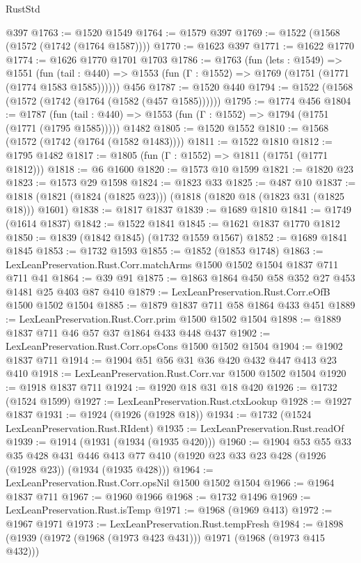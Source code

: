 \begin{lexlean}{RustStd}
\begin{coremodule}
{\begin{coremodule}
{{{{{    @397
@1763 := @1520 @1549
@1764 := @1579 @397
@1769 := @1522 (@1568 (@1572 (@1742 (@1764 @1587))))
@1770 := @1623 @397
@1771 := @1622 @1770
@1774 := @1626 @1770 @1701 @1703
@1786 := @1763
    (fun (lets : @1549) =>
    @1551
      (fun (tail : @440) => @1553 (fun (Γ : @1552) => @1769 (@1751 (@1771 (@1774 @1583 @1585))))))
    @456
@1787 := @1520 @440
@1794 := @1522 (@1568 (@1572 (@1742 (@1764 (@1582 (@457 @1585))))))
@1795 := @1774 @456
@1804 := @1787
    (fun (tail : @440) => @1553 (fun (Γ : @1552) => @1794 (@1751 (@1771 (@1795 @1585)))))
    @1482
@1805 := @1520 @1552
@1810 := @1568 (@1572 (@1742 (@1764 (@1582 @1483))))
@1811 := @1522 @1810
@1812 := @1795 @1482
@1817 := @1805 (fun (Γ : @1552) => @1811 (@1751 (@1771 @1812)))
@1818 := @6 @1600
@1820 := @1573 @10 @1599
@1821 := @1820 @23
@1823 := @1573 @29 @1598
@1824 := @1823 @33
@1825 := @487 @10
@1837 := @1818 (@1821 (@1824 (@1825 @23))) (@1818 (@1820 @18 (@1823 @31 (@1825 @18))) @1601)
@1838 := @1817 @1837
@1839 := @1689 @1810
@1841 := @1749 (@1614 @1837)
@1842 := @1522 @1841
@1845 := @1621 @1837 @1770 @1812
@1850 := @1839 (@1842 @1845) (@1732 @1559 @1567)
@1852 := @1689 @1841 @1845
@1853 := @1732 @1593
@1855 := @1852 (@1853 @1748)
@1863 := LexLeanPreservation.Rust.Corr.matchArms @1500 @1502 @1504 @1837 @711 @711 @41
@1864 := @39 @91
@1875 := @1863 @1864 @450 @58 @352 @27 @453 @1481 @25 @403 @87 @410
@1879 := LexLeanPreservation.Rust.Corr.eOfB @1500 @1502 @1504
@1885 := @1879 @1837 @711 @58 @1864 @433 @451
@1889 := LexLeanPreservation.Rust.Corr.prim @1500 @1502 @1504
@1898 := @1889 @1837 @711 @46 @57 @37 @1864 @433 @448 @437
@1902 := LexLeanPreservation.Rust.Corr.opsCons @1500 @1502 @1504
@1904 := @1902 @1837 @711
@1914 := @1904 @51 @56 @31 @36 @420 @432 @447 @413 @23 @410
@1918 := LexLeanPreservation.Rust.Corr.var @1500 @1502 @1504
@1920 := @1918 @1837 @711
@1924 := @1920 @18 @31 @18 @420
@1926 := @1732 (@1524 @1599)
@1927 := LexLeanPreservation.Rust.ctxLookup
@1928 := @1927 @1837
@1931 := @1924 (@1926 (@1928 @18))
@1934 := @1732 (@1524 LexLeanPreservation.Rust.RIdent)
@1935 := LexLeanPreservation.Rust.readOf
@1939 := @1914 (@1931 (@1934 (@1935 @420)))
@1960 := @1904
    @53
    @55
    @33
    @35
    @428
    @431
    @446
    @413
    @77
    @410
    (@1920 @23 @33 @23 @428 (@1926 (@1928 @23)) (@1934 (@1935 @428)))
@1964 := LexLeanPreservation.Rust.Corr.opsNil @1500 @1502 @1504
@1966 := @1964 @1837 @711
@1967 := @1960 @1966
@1968 := @1732 @1496
@1969 := LexLeanPreservation.Rust.isTemp
@1971 := @1968 (@1969 @413)
@1972 := @1967 @1971
@1973 := LexLeanPreservation.Rust.tempFresh
@1984 := @1898 (@1939 (@1972 (@1968 (@1973 @423 @431))) @1971 (@1968 (@1973 @415 @432)))
}}}}}
\end{coremodule}}
\end{coremodule}
\end{lexlean}
